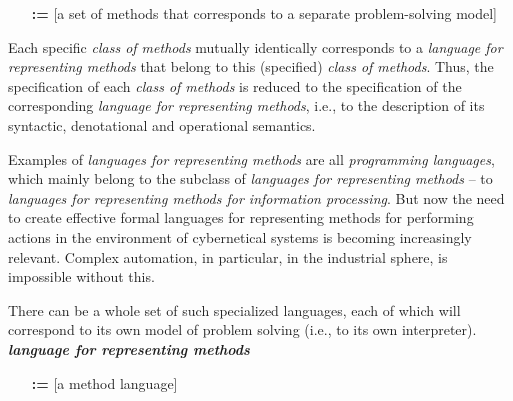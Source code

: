 \documentclass{report}
\begin{document}
\begin{multicols}{2}
\begin{itemize}[noitemsep]
    \item [\textbf{:=}] [a set of methods that corresponds to a separate problem-solving model]
\end{itemize}
\vspace{2mm}
Each specific \textit{class of methods} mutually identically
corresponds to a \textit{language for representing methods}
that belong to this (specified) \textit{class of methods}. Thus,
the specification of each \textit{class of methods} is reduced
to the specification of the corresponding \textit{language for
representing methods}, i.e., to the description of its
syntactic, denotational and operational semantics.

Examples of \textit{languages for representing methods} are
all \textit{programming languages}, which mainly belong to
the subclass of \textit{languages for representing methods} –
to \textit{languages for representing methods for information
processing}. But now the need to create effective formal
languages for representing methods for performing actions
in the environment of cybernetical systems is becoming
increasingly relevant. Complex automation, in particular,
in the industrial sphere, is impossible without this.

There can be a whole set of such specialized languages,
each of which will correspond to its own model of
problem solving (i.e., to its own interpreter).
\vspace{4mm}
\\ \textbf{\textit{language for representing methods}}
\begin{itemize}[noitemsep]
    \item [\textbf{:=}] [a method language]
\end{itemize}

\end{multicols}
\end{document}
